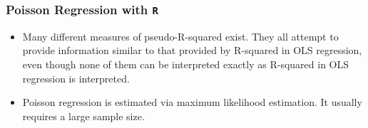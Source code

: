 \documentclass[00-GLMregslides.tex]{subfiles}
\begin{document}
\begin{frame}[fragile]
	\frametitle{Poisson Regression with \texttt{R}}
	\Large
	\begin{itemize} 

\item Many different measures of pseudo-R-squared exist. They all attempt to provide information similar to that provided by R-squared in OLS regression, even though none of them can be interpreted exactly as R-squared in OLS regression is interpreted.
 
\item Poisson regression is estimated via maximum likelihood estimation. It usually requires a large sample size. 
\end{itemize}
\end{frame}

\end{document}
